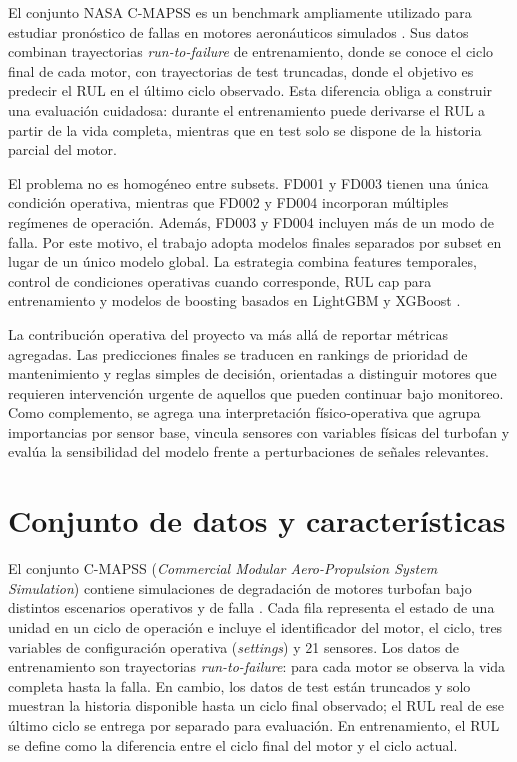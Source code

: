 \documentclass[conference, a4paper]{IEEEtran}
\begin{document}
El conjunto NASA C-MAPSS es un benchmark ampliamente utilizado para estudiar pronóstico de fallas en motores aeronáuticos simulados \cite{nasa_cmapss_dataset,saxena2008damage}. Sus datos combinan trayectorias \textit{run-to-failure} de entrenamiento, donde se conoce el ciclo final de cada motor, con trayectorias de test truncadas, donde el objetivo es predecir el RUL en el último ciclo observado. Esta diferencia obliga a construir una evaluación cuidadosa: durante el entrenamiento puede derivarse el RUL a partir de la vida completa, mientras que en test solo se dispone de la historia parcial del motor.

El problema no es homogéneo entre subsets. FD001 y FD003 tienen una única condición operativa, mientras que FD002 y FD004 incorporan múltiples regímenes de operación. Además, FD003 y FD004 incluyen más de un modo de falla. Por este motivo, el trabajo adopta modelos finales separados por subset en lugar de un único modelo global. La estrategia combina features temporales, control de condiciones operativas cuando corresponde, RUL cap para entrenamiento y modelos de boosting basados en LightGBM \cite{ke2017lightgbm} y XGBoost \cite{chen2016xgboost}.

La contribución operativa del proyecto va más allá de reportar métricas agregadas. Las predicciones finales se traducen en rankings de prioridad de mantenimiento y reglas simples de decisión, orientadas a distinguir motores que requieren intervención urgente de aquellos que pueden continuar bajo monitoreo. Como complemento, se agrega una interpretación físico-operativa que agrupa importancias por sensor base, vincula sensores con variables físicas del turbofan y evalúa la sensibilidad del modelo frente a perturbaciones de señales relevantes.

\section{Conjunto de datos y características}
El conjunto C-MAPSS (\textit{Commercial Modular Aero-Propulsion System Simulation}) contiene simulaciones de degradación de motores turbofan bajo distintos escenarios operativos y de falla \cite{nasa_cmapss_dataset,saxena2008damage}. Cada fila representa el estado de una unidad en un ciclo de operación e incluye el identificador del motor, el ciclo, tres variables de configuración operativa (\textit{settings}) y 21 sensores. Los datos de entrenamiento son trayectorias \textit{run-to-failure}: para cada motor se observa la vida completa hasta la falla. En cambio, los datos de test están truncados y solo muestran la historia disponible hasta un ciclo final observado; el RUL real de ese último ciclo se entrega por separado para evaluación. En entrenamiento, el RUL se define como la diferencia entre el ciclo final del motor y el ciclo actual.
\end{document}
